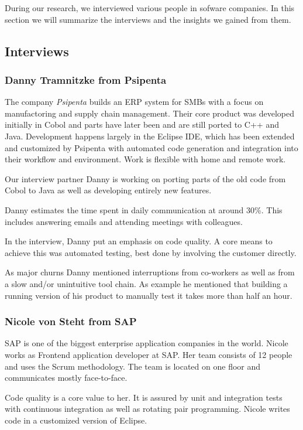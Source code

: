 During our research, we interviewed various people in sofware companies. In this section we will summarize the interviews and the insights we gained from them.

\subsection{Interviews}
\subsubsection{Danny Tramnitzke from Psipenta}
The company \emph{Psipenta} builds an ERP system for SMBs with a focus on manufactoring and supply chain management. Their core product was developed initially in Cobol and parts have later been and are still ported to C++ and Java. Development happens largely in the Eclipse IDE, which has been extended and customized by Psipenta with automated code generation and integration into their workflow and environment. Work is flexible with home and remote work.

Our interview partner Danny is working on porting parts of the old code from Cobol to Java as well as developing entirely new features.

Danny estimates the time spent in daily communication at around 30\%. This includes answering emails and attending meetings with colleagues.

In the interview, Danny put an emphasis on code quality. A core means to achieve this was automated testing, best done by involving the customer directly.

As major churns Danny mentioned interruptions from co-workers as well as from a slow and/or unintuitive tool chain. As example he mentioned that building a running version of his product to manually test it takes more than half an hour.

\subsubsection{Nicole von Steht from SAP}
SAP is one of the biggest enterprise application companies in the world. Nicole works as Frontend application developer at SAP. Her team consists of 12 people and uses the Scrum methodology. The team is located on one floor and communicates mostly face-to-face.

Code quality is a core value to her. It is assured by unit and integration tests with continuous integration as well as rotating pair programming. Nicole writes code in a customized version of Eclipse.

